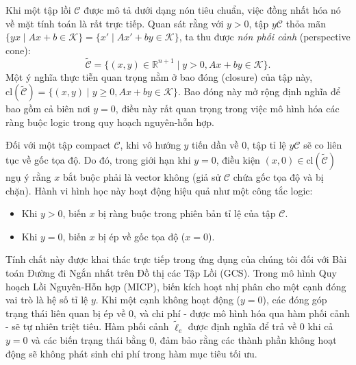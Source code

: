 Khi một tập lồi $\mathcal{C}$ được mô tả dưới dạng nón tiêu chuẩn, việc đồng nhất hóa nó về mặt tính toán là rất trực tiếp. Quan sát rằng với $y > 0$, tập $y\mathcal{C}$ thỏa mãn $\{yx \mid Ax + b \in \mathcal{K}\} = \{x' \mid Ax' + by \in \mathcal{K}\}$, ta thu được \textit{nón phối cảnh} (perspective cone):
\begin{equation}
\widetilde{\mathcal{C}} = \{(x, y) \in \mathbb{R}^{n+1} \mid y > 0, Ax + by \in \mathcal{K}\}.
\label{eq:perspective_cone}
\end{equation}
Một ý nghĩa thực tiễn quan trọng nằm ở bao đóng (closure) của tập này, $\text{cl}(\widetilde{\mathcal{C}}) = \{(x, y) \mid y \geq 0, Ax + by \in \mathcal{K}\}$. Bao đóng này mở rộng định nghĩa để bao gồm cả biên nơi $y=0$, điều này rất quan trọng trong việc mô hình hóa các ràng buộc logic trong quy hoạch nguyên-hỗn hợp.

Đối với một tập compact $\mathcal{C}$, khi vô hướng $y$ tiến dần về 0, tập tỉ lệ $y\mathcal{C}$ sẽ co liên tục về gốc tọa độ. Do đó, trong giới hạn khi $y=0$, điều kiện $(x, 0) \in \text{cl}(\widetilde{\mathcal{C}})$ ngụ ý rằng $x$ bắt buộc phải là vector không (giả sử $\mathcal{C}$ chứa gốc tọa độ và bị chặn). Hành vi hình học này hoạt động hiệu quả như một công tắc logic:
\begin{itemize}
\item Khi $y > 0$, biến $x$ bị ràng buộc trong phiên bản tỉ lệ của tập $\mathcal{C}$.
\item Khi $y = 0$, biến $x$ bị ép về gốc tọa độ ($x=0$).
\end{itemize}
Tính chất này được khai thác trực tiếp trong ứng dụng của chúng tôi đối với Bài toán Đường đi Ngắn nhất trên Đồ thị các Tập Lồi (GCS). Trong mô hình Quy hoạch Lồi Nguyên-Hỗn hợp (MICP), biến kích hoạt nhị phân cho một cạnh đóng vai trò là hệ số tỉ lệ $y$. Khi một cạnh không hoạt động ($y=0$), các đóng góp trạng thái liên quan bị ép về 0, và chi phí - được mô hình hóa qua hàm phối cảnh - sẽ tự nhiên triệt tiêu. Hàm phối cảnh $\tilde{\ell}_e$ được định nghĩa để trả về 0 khi cả $y=0$ và các biến trạng thái bằng 0, đảm bảo rằng các thành phần không hoạt động sẽ không phát sinh chi phí trong hàm mục tiêu tối ưu.

